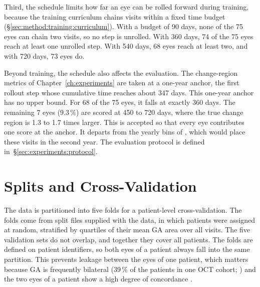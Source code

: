 Third, the schedule limits how far an eye can be rolled forward during
training, because the training curriculum chains visits within a fixed
time budget (\S\ref{sec:method:training:curriculum}). With a budget of 90 days, none
of the 75 eyes can chain two visits, so no step is unrolled. With 360
days, 74 of the 75 eyes reach at least one unrolled step. With 540 days,
68 eyes reach at least two, and with 720 days, 73 eyes do.

Beyond training, the schedule also affects the evaluation. The
change-region metrics of Chapter~\ref{ch:experiments} are taken at a
one-year anchor, the first rollout step whose cumulative time reaches
about 347 days. This one-year anchor has no upper bound. For 68 of the 75 eyes, it
falls at exactly 360 days. The remaining 7 eyes (9.3\,\%) are scored at 450 to
720 days, where the true change region is 1.3 to 1.7 times larger.
This is accepted so that every eye contributes one score at the anchor. It
departs from the yearly bins of \citet{Mai2024}, which would place these
visits in the second year.
The evaluation protocol is defined in~\S\ref{sec:experiments:protocol}.


\section{Splits and Cross-Validation}
\label{sec:data:splits}

The data is partitioned into five folds for a patient-level
cross-validation. The folds come from split files supplied with the data,
in which patients were assigned at random, stratified by quartiles of
their mean GA area over all visits.
The five validation sets do not overlap, and together
they cover all patients. The folds are defined on patient identifiers, so
both eyes of a patient always fall into the same partition. This prevents leakage
between the eyes of one patient, which matters because GA is frequently
bilateral (39\,\% of the patients in one OCT cohort;
\citealp{Yehoshua2011}) and the two eyes of a patient show a high degree
of concordance \citep{Boyer2017}.

